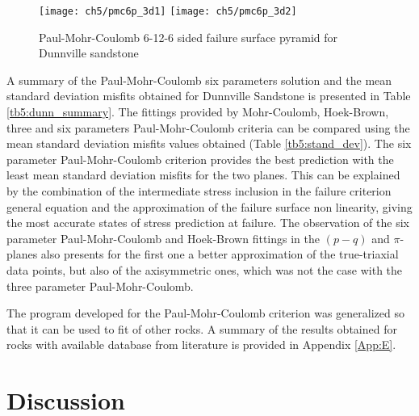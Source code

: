 \begin{figure}
    \centering
    \texttt{[image: ch5/pmc6p\_3d1]}
    \texttt{[image: ch5/pmc6p\_3d2]}
    \caption{Paul-Mohr-Coulomb 6-12-6 sided failure surface pyramid for Dunnville sandstone}
    \label{fig5:pmc6p_3d}
\end{figure}

A summary of the Paul-Mohr-Coulomb six parameters solution and the mean standard deviation misfits obtained for Dunnville Sandstone is presented in Table \ref{tb5:dunn_summary}. The fittings provided by Mohr-Coulomb, Hoek-Brown, three and six parameters Paul-Mohr-Coulomb criteria can be compared using the mean standard deviation misfits values obtained (Table \ref{tb5:stand_dev}). 
The six parameter Paul-Mohr-Coulomb criterion provides the best prediction with the least mean standard deviation misfits for the two planes. This can be explained by the combination of the intermediate stress inclusion in the failure criterion general equation and the approximation of the failure surface non linearity, giving the most accurate states of stress prediction at failure. The observation of the six parameter Paul-Mohr-Coulomb and Hoek-Brown fittings in the $(p-q)$ and $\pi$- planes also presents for the first one a better approximation of the true-triaxial data points, but also of the axisymmetric ones, which was not the case with the three parameter Paul-Mohr-Coulomb. 

The program developed for the Paul-Mohr-Coulomb criterion was generalized so that it can be used to fit of other rocks. A summary of the results obtained for rocks with available database from literature is provided in Appendix \ref{App:E}.

\section{Discussion}

